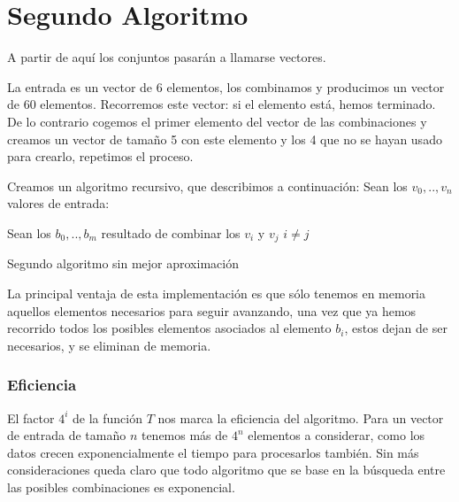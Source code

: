 \section{Segundo Algoritmo}
A partir de aquí los conjuntos pasarán a llamarse vectores.

La entrada es un vector de 6 elementos, los combinamos y
producimos un vector de 60 elementos.
Recorremos este vector: si el elemento está, hemos terminado.
De lo contrario cogemos el primer elemento del vector de las combinaciones y
creamos un vector de tamaño 5 con este elemento y los 4 que no se hayan usado
para crearlo, repetimos el proceso.

Creamos un algoritmo recursivo, que describimos a continuación:
Sean los $v_0,..,v_n$ valores de entrada:
\vspace{1cm}

\begin{algorithm}[H]

 \hspace{0.25cm}	Sean los $b_0,..,b_{m}$ resultado de combinar los $v_i$ y $v_j$ $i \neq j$  \;
\caption{Segundo algoritmo sin mejor aproximación}
\end{algorithm}

\vspace{0.25cm}

La principal ventaja de esta implementación es que sólo tenemos en memoria
aquellos elementos necesarios para seguir avanzando, una vez que ya hemos
recorrido todos los posibles elementos asociados al elemento $b_i$, estos
dejan de ser necesarios, y se eliminan de memoria.

\subsubsection{Eficiencia}

El factor $4^i$ de la función $T$ nos marca la eficiencia del algoritmo.
Para un vector de entrada de tamaño $n$ tenemos más de $4^n$ elementos a
considerar, como los datos crecen exponencialmente el tiempo para procesarlos
también. Sin más consideraciones queda claro que todo algoritmo que se base en
la búsqueda entre las posibles combinaciones es exponencial.


